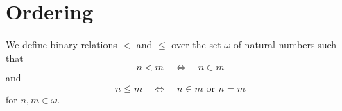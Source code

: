 \section{Ordering}
\begin{definition}
  We define binary relations $<$ and $\leq$ over the set $\omega$ of natural
  numbers such that
  \begin{equation*}
    n < m
    \quad \Leftrightarrow \quad
    n \in m
  \end{equation*}
  and
  \begin{equation*}
    n \leq m
    \quad \Leftrightarrow \quad
    \text{$n \in m$ or $n = m$}
  \end{equation*}
  for $n, m \in \omega$.
\end{definition}